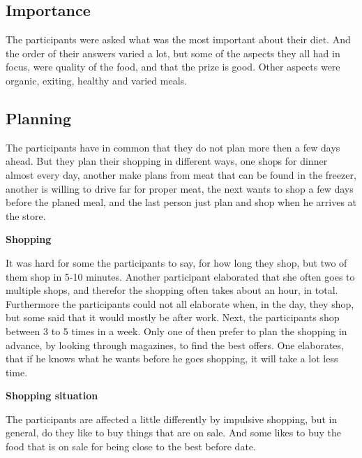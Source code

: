 \subsection{Importance}
The participants were asked what was the most important about their diet. And the order of their answers varied a lot, but some of the aspects they all had in focus, were quality of the food, and that the prize is good. Other aspects were organic, exiting, healthy and varied meals.
\subsection{Planning}
The participants have in common that they do not plan more then a few days ahead. But they plan their shopping in different ways, one shops for dinner almost every day, another make plans from meat that can be found in the freezer, another is willing to drive far for proper meat, the next wants to shop a few days before the planed meal, and the last person just plan and shop when he arrives at the store.

\textbf{Shopping}

It was hard for some the participants to say, for how long they shop, but two of them shop in 5-10 minutes. Another participant elaborated that she often goes to multiple shops, and therefor the shopping often takes about an hour, in total. Furthermore the participants could not all elaborate when, in the day, they shop, but some said that it would mostly be after work. Next, the participants shop between 3 to 5 times in a week. Only one of then prefer to plan the shopping in advance, by looking through magazines, to find the best offers. One elaborates, that if he knows what he wants before he goes shopping, it will take a lot less time.

\textbf{Shopping situation}

The participants are affected a little differently by impulsive shopping, but in general, do they like to buy things that are on sale. And some likes to buy the food that is on sale for being close to the best before date.